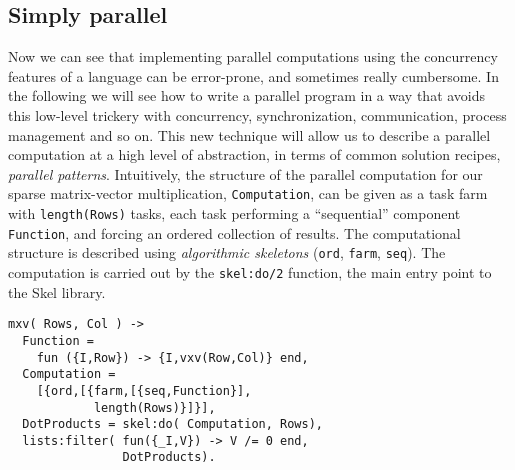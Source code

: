 \subsection{Simply parallel}\label{simply-parallel}

Now we can see that implementing parallel computations using the
concurrency features of a language can be error-prone, and sometimes
really cumbersome. In the following we will see how to write a parallel
program in a way that avoids this low-level trickery with concurrency,
synchronization, communication, process management and so on. This new
technique will allow us to describe a parallel computation at a high
level of abstraction, in terms of common solution recipes,
\emph{parallel patterns}.
Intuitively, the structure of the parallel computation for
our sparse matrix-vector multiplication, \lstinline[language=myerlang]{Computation}, can be
given as a task farm with \lstinline[language=myerlang]{length(Rows)} tasks, each task
performing a ``sequential'' component \lstinline[language=myerlang]{Function}, and forcing an
ordered collection of results. The computational structure is described
using \emph{algorithmic skeletons} (\lstinline[language=myerlang]{ord}, \lstinline[language=myerlang]{farm},
\lstinline[language=myerlang]{seq}). The computation is carried out by the \lstinline[language=myerlang]{skel:do/2}
function, the main entry point to the Skel library.

\begin{lstlisting}[language=myerlang]
mxv( Rows, Col ) ->
  Function =
    fun ({I,Row}) -> {I,vxv(Row,Col)} end,
  Computation =
    [{ord,[{farm,[{seq,Function}],
            length(Rows)}]}],
  DotProducts = skel:do( Computation, Rows),
  lists:filter( fun({_I,V}) -> V /= 0 end,
                DotProducts).
\end{lstlisting}



